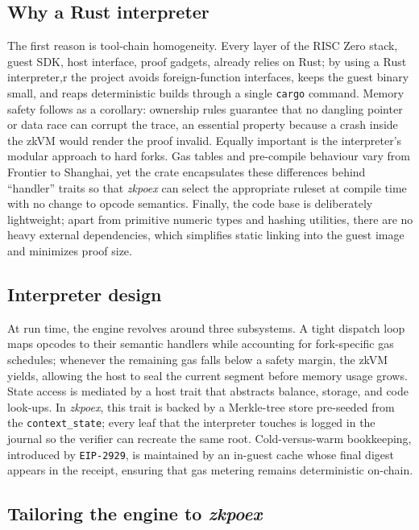 \subsection{Why a Rust interpreter}

The first reason is tool-chain homogeneity.  Every layer of the RISC Zero stack, guest SDK, host interface, proof gadgets, already relies on Rust; by using a Rust interpreter,r the project avoids foreign-function interfaces, keeps the guest binary small, and reaps deterministic builds through a single \texttt{cargo} command.  Memory safety follows as a corollary: ownership rules guarantee that no dangling pointer or data race can corrupt the trace, an essential property because a crash inside the zkVM would render the proof invalid. Equally important is the interpreter’s modular approach to hard forks. Gas tables and pre-compile behaviour vary from Frontier to Shanghai, yet the crate encapsulates these differences behind “handler” traits so that \textit{zkpoex} can select the appropriate ruleset at compile time with no change to opcode semantics. Finally, the code base is deliberately lightweight; apart from primitive numeric types and hashing utilities, there are no heavy external dependencies, which simplifies static linking into the guest image and minimizes proof size.

\subsection{Interpreter design}

At run time, the engine revolves around three subsystems.  A tight dispatch loop maps opcodes to their semantic handlers while accounting for fork-specific gas schedules; whenever the remaining gas falls below a safety margin, the zkVM yields, allowing the host to seal the current segment before memory usage grows. State access is mediated by a host trait that abstracts balance, storage, and code look-ups.  In \textit{zkpoex}, this trait is backed by a Merkle-tree store pre-seeded from the \texttt{context\_state}; every leaf that the interpreter touches is logged in the journal so the verifier can recreate the same root.  Cold-versus-warm bookkeeping, introduced by \texttt{EIP-2929}, is maintained by an in-guest cache whose final digest appears in the receipt, ensuring that gas metering remains deterministic on-chain.

\subsection{Tailoring the engine to \textit{zkpoex}}

